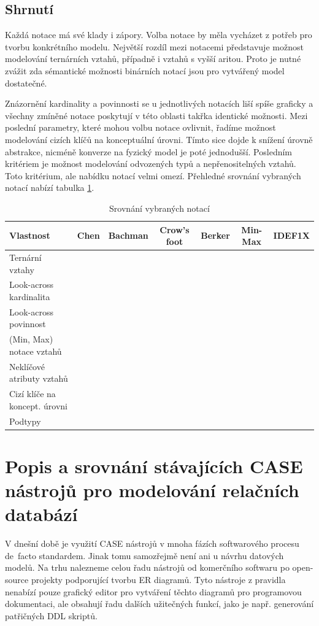 \documentclass[czech,bachelor,public,dept460,male,oneside]{diploma}
\newcommand{\xmark}{\ding{55}}
\newcommand{\cmark}{\ding{51}}
\begin{document}
	\subsection{Shrnutí}
	Každá notace má své klady i zápory. Volba notace by měla vycházet z potřeb pro tvorbu konkrétního modelu. Největší rozdíl mezi notacemi představuje možnost modelování ternárních vztahů, případně i vztahů s vyšší aritou. Proto je nutné zvážit zda sémantické možnosti binárních notací jsou pro vytvářený model dostatečné. 
	
	Znázornění kardinality a povinnosti se u jednotlivých notacích liší spíše graficky a všechny zmíněné notace poskytují v této oblasti takřka identické možnosti. Mezi poslední parametry, které mohou volbu notace ovlivnit, řadíme možnost modelování cizích klíčů na konceptuální úrovni. Tímto sice dojde k snížení úrovně abstrakce, nicméně konverze na fyzický model je poté jednodušší. Posledním kritériem je možnost modelování odvozených typů a nepřenositelných vztahů. Toto kritérium, ale nabídku notací velmi omezí. Přehledné srovnání vybraných notací nabízí tabulka \ref{tab:notationCmp}.
	
	\begin{table}[h!]
		\centering
		\caption{Srovnání vybraných notací}
		\label{tab:notationCmp}
		\begin{tabular}{l c c c c c c}
			\toprule
			Vlastnost & Chen & Bachman & Crow's foot & Berker & Min-Max & IDEF1X \\
			\midrule
			Ternární vztahy & \cmark & \xmark & \xmark & \xmark & \xmark & \xmark \\
			Look-across kardinalita & \cmark & \cmark & \cmark & \cmark & \xmark & \cmark \\
			Look-across povinnost & \xmark & \xmark & \cmark & \xmark & \xmark & \cmark \\
			(Min, Max) notace vztahů & \xmark & \xmark & \cmark & \xmark & \cmark & \cmark \\
			Neklíčové atributy vztahů & \cmark & \xmark & \xmark & \xmark & \xmark & \xmark \\
			Cizí klíče na koncept. úrovni & \xmark & \cmark & \xmark & \xmark & \xmark & \cmark \\
			Podtypy & \cmark & \cmark & \cmark & \cmark & \cmark & \xmark \\
			\midrule
		\end{tabular}
	\end{table}

\newpage
\section{Popis a srovnání stávajících CASE nástrojů pro modelování relačních databází}
V dnešní době je využití CASE nástrojů v mnoha fázích softwarového procesu de~facto standardem. Jinak tomu samozřejmě není ani u návrhu datových modelů. Na trhu nalezneme celou řadu nástrojů od komerčního softwaru po open-source projekty podporující tvorbu ER diagramů. Tyto nástroje z pravidla nenabízí pouze grafický editor pro vytváření těchto diagramů pro programovou dokumentaci, ale obsahují řadu dalších užitečných funkcí, jako je např. generování patřičných DDL skriptů.
	
\end{document}
